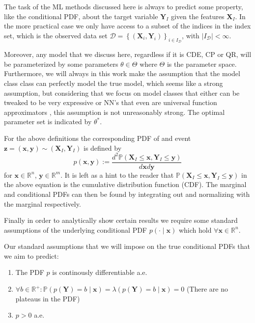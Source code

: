 The task of the ML methods discussed here is always to predict some property, like the conditional PDF, about the target variable $\mathbf{Y}_I$ given the features $\mathbf{X}_I$. In the more practical case we only have access to a subset of the indices in the index set, which is the observed data set $\mathcal{D} = \left\{(\mathbf{X}_i, \mathbf{Y}_i)\right\}_{i\in I_{\mathcal{D}}}$, with $|I_{\mathcal{D}}| < \infty$.

Moreover, any model that we discuss here, regardless if it is CDE, CP or QR, will be parameterized by some parameters $\theta \in \Theta$ where $\Theta$ is the parameter space. Furthermore, we will always in this work make the assumption that the model class class can perfectly model the true model, which seems like a strong assumption, but considering that we focus on model classes that either can be tweaked to be very expressive or NN's that even are universal function approximators \cite{HORNIK1989359}, this assumption is not unreasonably strong. The optimal parameter set is indicated by $\theta^*$.

For the above definitions the corresponding PDF of and event $\mathbf{z} = (\mathbf{x}, \mathbf{y}) \sim (\mathbf{X}_I, \mathbf{Y}_I)$ is defined by
\begin{equation}
    p(\mathbf{x}, \mathbf{y}):=\frac{d^2 \mathbb{P}(\mathbf{X}_I \leq
        \mathbf{x}, \mathbf{Y}_I \leq \mathbf{y})}{d \mathbf{x} d \mathbf{y}}
\end{equation}
for $\mathbf{x} \in \mathbb{R}^n$, $\mathbf{y}\in\mathbb{R}^m$. It is left as a hint to the reader that $\mathbb{P}(\mathbf{X}_I \leq
    \mathbf{x}, \mathbf{Y}_I \leq \mathbf{y})$ in the above equation is the cumulative distribution function (CDF). The marginal and conditional PDFs can then be found by integrating out and normalizing with the marginal respectively.

Finally in order to analytically show certain results we require some standard assumptions of the underlying conditional PDF $p(\cdot\mid \mathbf{x})$ which hold $\forall \mathbf{x}\in \mathbb{R}^n$.

\begin{definition}\label{def:assumptions} %
    Our standard assumptions that we will impose on the true conditional PDFs that we aim to predict:
    \begin{enumerate}

        \item The PDF $p$ is continously differentiable a.e.
        \item $\forall b\in\mathbb{R}^+: \mathbb{P}(p(\mathbf{Y}) = b\mid \mathbf{x}) = \lambda(p(\mathbf{Y}) = b \mid \mathbf{x}) = 0$ (There are no plateaus in the PDF)
        \item $p > 0$ a.e.
    \end{enumerate}
\end{definition}


